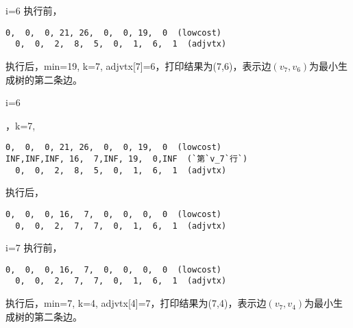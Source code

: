 \begin{frame}[fragile]\ft{\subsubsecname}
\tf i=6  
执行前，
\begin{lstlisting}[xleftmargin=2em]
  0,  0,  0, 21, 26,  0,  0, 19,  0  (lowcost)
  0,  0,  2,  8,  5,  0,  1,  6,  1  (adjvtx)
\end{lstlisting} %
执行后，min=19, k=7, adjvtx[7]=6，打印结果为(7,6)，表示边$(v_7,v_6)$为最小生成树的第二条边。
\end{frame}


\begin{frame}\ft{\subsubsecname}
\begin{figure}

\end{figure}
\end{frame}


\begin{frame}[fragile]\ft{\subsubsecname}
\tf i=6

，k=7,  
\begin{lstlisting}[xleftmargin=2em]
  0,  0,  0, 21, 26,  0,  0, 19,  0  (lowcost)
INF,INF,INF, 16,  7,INF, 19,  0,INF  (`第`v_7`行`)
  0,  0,  2,  8,  5,  0,  1,  6,  1  (adjvtx)
\end{lstlisting}   %
执行后，
\begin{lstlisting}[xleftmargin=2em]
  0,  0,  0, 16,  7,  0,  0,  0,  0  (lowcost)
  0,  0,  2,  7,  7,  0,  1,  6,  1  (adjvtx)
\end{lstlisting}
\end{frame}


\begin{frame}[fragile]\ft{\subsubsecname}
\tf i=7
执行前，
\begin{lstlisting}[xleftmargin=2em]
  0,  0,  0, 16,  7,  0,  0,  0,  0  (lowcost)
  0,  0,  2,  7,  7,  0,  1,  6,  1  (adjvtx)
\end{lstlisting} %
执行后，min=7, k=4, adjvtx[4]=7，打印结果为(7,4)，表示边$(v_7,v_4)$为最小生成树的第二条边。
\end{frame}


